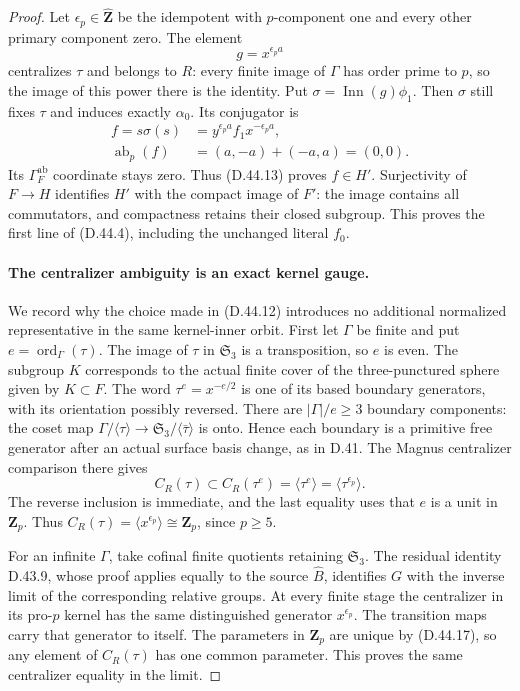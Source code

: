 \begin{proof}
Let \(\epsilon_p\in\widehat{\mathbf Z}\)
be the idempotent with \(p\)-component
one and every other primary
component zero.
The element
\[
                         g=x^{\epsilon_p a}
 \tag{D.44.15}
\]
centralizes \(\tau\) and belongs
to \(R\): every finite image of
\(\Gamma\) has order prime to \(p\),
so the image of this power there
is the identity.
Put \(\sigma=\operatorname{Inn}(g)\phi_1\).
Then \(\sigma\) still fixes \(\tau\)
and induces exactly \(\alpha_0\).
Its conjugator is
\[
 \begin{split}
 f=s\sigma(s)
   &=y^{\epsilon_p a}f_1x^{-\epsilon_p a},\\
 \operatorname{ab}_p(f)
   &=(a,-a)+(-a,a)=(0,0).
 \end{split}
 \tag{D.44.16}
\]
Its \(\Gamma_F^{\mathrm{ab}}\)
coordinate stays zero.
Thus \textup{(D.44.13)} proves
\(f\in H'\).
Surjectivity of \(F\to H\)
identifies \(H'\) with the
compact image of \(F'\):
the image contains all
commutators, and compactness
retains their closed subgroup.
This proves the first line
of \textup{(D.44.4)}, including
the unchanged literal \(f_0\).

\paragraph{The centralizer ambiguity is an exact kernel gauge.}
We record why the choice made
in \textup{(D.44.12)} introduces
no additional normalized
representative in the same
kernel-inner orbit.
First let \(\Gamma\) be finite
and put \(e=\operatorname{ord}_\Gamma(\tau)\).
The image of \(\tau\) in
\(\mathfrak S_3\) is a
transposition, so \(e\) is even.
The subgroup \(K\) corresponds
to the actual finite cover of
the three-punctured sphere
given by \(K\subset F\).
The word \(\tau^e=x^{-e/2}\)
is one of its based boundary
generators, with its orientation
possibly reversed.
There are \(|\Gamma|/e\geq3\)
boundary components: the coset
map \(\Gamma/\langle\tau\rangle
\to\mathfrak S_3/\langle\bar\tau\rangle\)
is onto.
Hence each boundary is a
primitive free generator after
an actual surface basis change,
as in D.41.
The Magnus centralizer comparison
there gives
\[
 C_R(\tau)\subset C_R(\tau^e)
   =\langle\tau^e\rangle
   =\langle\tau^{\epsilon_p}\rangle.
 \tag{D.44.17}
\]
The reverse inclusion is
immediate, and the last equality
uses that \(e\) is a unit in
\(\mathbf Z_p\).
Thus
\(C_R(\tau)=\langle x^{\epsilon_p}\rangle
\cong\mathbf Z_p\), since \(p\geq5\).

For an infinite \(\Gamma\),
take cofinal finite quotients
retaining \(\mathfrak S_3\).
The residual identity D.43.9,
whose proof applies equally
to the source \(\widehat B\),
identifies \(G\) with the
inverse limit of the corresponding
relative groups.
At every finite stage the
centralizer in its pro-\(p\)
kernel has the same distinguished
generator \(x^{\epsilon_p}\).
The transition maps carry
that generator to itself.
The parameters in
\(\mathbf Z_p\) are unique
by \textup{(D.44.17)}, so
any element of \(C_R(\tau)\)
has one common parameter.
This proves the same
centralizer equality in
the limit.


\end{proof}
